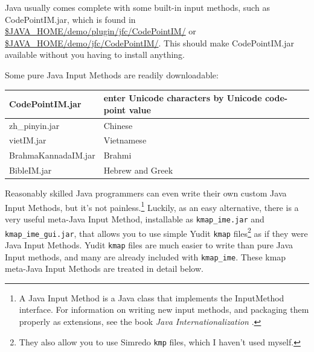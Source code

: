 \documentclass[letterpaper,12pt]{article}
\begin{document}
Java usually comes complete with some built-in input methods, such as
CodePointIM.jar, which is found in
\url{$JAVA_HOME/demo/plugin/jfc/CodePointIM/} or
\url{$JAVA_HOME/demo/jfc/CodePointIM/}.  This should make CodePointIM.jar
available without you having to install anything. 

Some pure Java Input Methods are readily downloadable:

\vspace{.5cm}
\noindent
\begin{tabular}{|l|l|}
\hline
CodePointIM.jar     & enter Unicode characters by Unicode code-point value\footnotemark\\
\hline
zh\_pinyin.jar      & Chinese\footnotemark\\
\hline
vietIM.jar          & Vietnamese\footnotemark\\
\hline
BrahmaKannadaIM.jar & Brahmi\footnotemark\\
\hline
BibleIM.jar         & Hebrew and Greek\footnotemark\\
\hline
\end{tabular}
\vspace{.5cm}

\addtocounter{footnote}{-4}






Reasonably skilled Java programmers can even write their own custom Java
Input Methods, but it's not painless.\footnote{A Java Input Method is a
Java class that implements the InputMethod interface.  For information on
writing new input methods, and packaging them properly as extensions, see
the book \emph{Java Internationalization}
\cite{deitsch+czarnecki:2001}.} Luckily, as an easy alternative, there is a very useful
meta-Java Input Method, installable as \texttt{kmap\_ime.jar} and
\texttt{kmap\_ime\_gui.jar}, that allows you to use simple Yudit
\texttt{kmap} files\footnote{They also allow you to use Simredo
\texttt{kmp} files, which I haven't used myself.} as if they were Java
Input Methods.  Yudit \texttt{kmap} files are much easier to write than
pure Java Input methods, and many are already included with
\texttt{kmap\_ime}.  These kmap meta-Java Input Methods are treated in
detail below.
\end{document}
